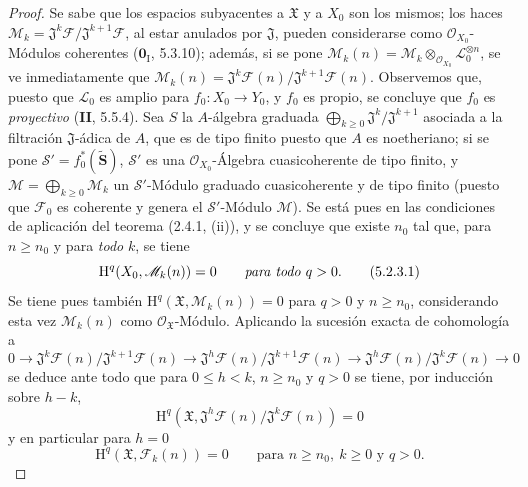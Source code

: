 \begin{proof}
Se sabe que los espacios subyacentes a $\mathfrak X$ y a $X_0$ son los mismos;
los haces
$\mathcal M_k=\mathfrak J^k\mathcal F/\mathfrak J^{k+1}\mathcal F$,
al estar anulados por $\mathfrak J$, pueden considerarse como
$\mathcal O_{X_0}$-Módulos coherentes ($\mathbf{0}_{\mathrm I}$, 5.3.10); además, si se
pone $\mathcal M_k(n)=\mathcal M_k\otimes_{\mathcal O_{X_0}}
\mathcal L_0^{\otimes n}$, se ve inmediatamente que
$\mathcal M_k(n)=\mathfrak J^k\mathcal F(n)/
\mathfrak J^{k+1}\mathcal F(n)$.
Observemos que, puesto que $\mathcal L_0$ es amplio para $f_0:X_0\to Y_0$, y
$f_0$ es propio, se concluye que $f_0$ es \emph{proyectivo} (\textbf{II}, 5.5.4). Sea $S$ la $A$-álgebra
graduada $\bigoplus_{k\geq0}\mathfrak J^k/\mathfrak J^{k+1}$ asociada a la filtración $\mathfrak J$-ádica de $A$, que es
de tipo finito puesto que $A$ es noetheriano; si se pone
$\mathcal S'=f_0^*(\widetilde{\mathbf S})$,
$\mathcal S'$ es una
$\mathcal O_{X_0}$-Álgebra cuasicoherente de tipo finito, y
$\mathcal M=\bigoplus_{k\geq0}\mathcal M_k$ un
$\mathcal S'$-Módulo graduado cuasicoherente y de tipo finito (puesto que $\mathcal F_0$
es coherente y genera el $\mathcal S'$-Módulo $\mathcal M$). Se está pues en las
condiciones de aplicación del teorema (2.4.1, (ii)), y se concluye que existe
$n_0$ tal que, para $n\geq n_0$ y para \emph{todo} $k$, se tiene
\begin{equation}
\mathrm H^q(X_0,\mathcal M_k(n))=0\qquad\text{\emph{para todo} }q>0.
\tag{5.2.3.1}
\label{III.5.2.3.1-fr}
\end{equation}
Se tiene pues también $\mathrm H^q(\mathfrak X,\mathcal M_k(n))=0$ para $q>0$ y
$n\geq n_0$, considerando esta vez $\mathcal M_k(n)$ como
$\mathcal O_{\mathfrak X}$-Módulo. Aplicando la sucesión exacta de cohomología a
\[
0\to
\mathfrak J^k\mathcal F(n)/\mathfrak J^{k+1}\mathcal F(n)
\to
\mathfrak J^h\mathcal F(n)/\mathfrak J^{k+1}\mathcal F(n)
\to
\mathfrak J^h\mathcal F(n)/\mathfrak J^k\mathcal F(n)
\to0
\]
se deduce ante todo que para $0\leq h<k$, $n\geq n_0$ y $q>0$ se tiene, por
inducción sobre $h-k$,
\begin{equation}
\mathrm H^q(\mathfrak X,
\mathfrak J^h\mathcal F(n)/\mathfrak J^k\mathcal F(n))=0
\tag{5.2.3.2}
\label{III.5.2.3.2-fr}
\end{equation}
y en particular para $h=0$
\begin{equation}
\mathrm H^q(\mathfrak X,\mathcal F_k(n))=0
\qquad\text{para }n\geq n_0,\ k\geq0\text{ y }q>0.
\tag{5.2.3.3}
\label{III.5.2.3.3-fr}
\end{equation}

\end{proof}
